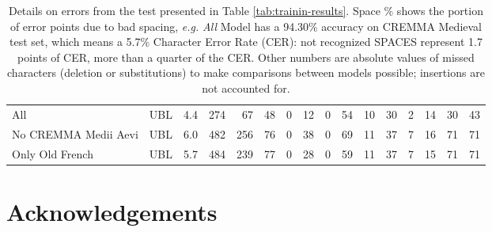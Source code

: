 \documentclass{article}
\begin{document}
\begin{table}[]
{{\begin{tabular}[H]{ll|r|rrrrrrrrrrrrr}
     All           &  UBL &             4.4 &    274 &               67 &     48 &  0 & 12 &  0 & 54 & 10 & 30 &  2 & 14 & 30 &      43 \\
No CREMMA Medii Aevi &  UBL &             6.0 &    482 &              256 &     76 &  0 & 38 &  0 & 69 & 11 & 37 &  7 & 16 & 71 &      71 \\
   Only Old French        &  UBL &             5.7 &    484 &              239 &     77 &  0 & 28 &  0 & 59 & 11 & 37 &  7 & 15 & 71 &      71 \\ 
\end{tabular}
}}
    \caption{Details on errors from the test presented in Table \ref{tab:trainin-results}. Space \% shows the portion of error points due to bad spacing, \textit{e.g.} \textit{All} Model has a 94.30\% accuracy on CREMMA Medieval test set, which means a 5.7\% Character Error Rate (CER): not recognized SPACES represent 1.7 points of CER, more than a quarter of the CER. Other numbers are absolute values of missed characters (deletion or substitutions) to make comparisons between models possible; insertions are not accounted for.}
    \label{tab:chars-errors}
\end{table}



\section*{Acknowledgements}
\end{document}
